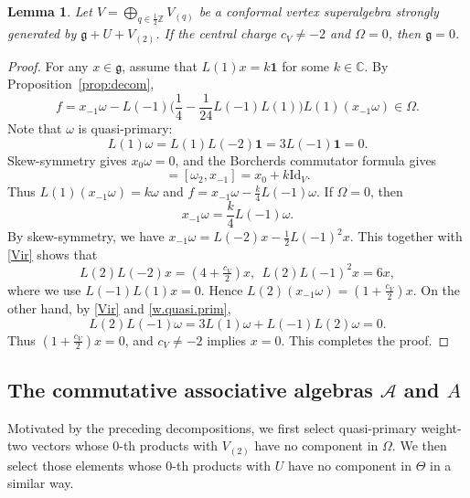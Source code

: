 \documentclass[12pt]{article}
\numberwithin{equation}{section}
\newtheorem{lemma}[theorem]{Lemma}
\theoremstyle{definition}
\theoremstyle{plain}
\newcommand{\bC}{\ensuremath{\mathbb{C}}}
\newcommand{\bZ}{\ensuremath{\mathbb{Z}}}
\newcommand{\fg}{\mathfrak{g}}
\newcommand{\Id}{\mathrm{Id }}
\newcommand{\cA}{\ensuremath{\mathcal{A}}}
\newcommand{\bone}{\mathbf{1 }}
\begin{document}
\begin{lemma}\label{lem:c=-2}
    Let $V=\bigoplus_{q\in\frac{1}{2}\bZ}V_{(q)}$ be a conformal vertex superalgebra strongly generated by $\fg+U+V_{(2)}$. If the central charge $c_V\neq-2$ and $\Omega=0$, then $\fg=0$.
\end{lemma}
\begin{proof}
    For any $x\in\fg$, assume that $L(1)x=k\bone$ for some $k\in\bC$. By Proposition~\ref{prop:decom},
    \begin{equation*}
        f=x_{-1}\omega-L(-1)\Big(\frac14-\frac1{24}L(-1)L(1)\Big)L(1)(x_{-1}\omega)
        \in\Omega.
    \end{equation*}
    Note that $\omega$ is quasi-primary:
    \begin{equation}\label{w.quasi.prim}
        L(1)\omega=L(1)L(-2)\bone=3L(-1)\bone=0.
    \end{equation}
    Skew-symmetry gives $x_0\omega=0$, and the Borcherds commutator formula gives
    \begin{equation*}
        [L(1),x_{-1}]=[\omega_2,x_{-1}]=x_0+k\Id_V.
    \end{equation*}
    Thus $L(1)(x_{-1}\omega)=k\omega$ and $f=x_{-1}\omega-\frac{k}{4}L(-1)\omega$. If $\Omega=0$, then
    \begin{equation*}
        x_{-1}\omega=\frac{k}{4}L(-1)\omega.
    \end{equation*}
    By skew-symmetry, we have $x_{-1}\omega=L(-2)x-\frac12L(-1)^2x$. This together with \eqref{Vir} shows that
    \begin{equation*}
        L(2)L(-2)x=(4+\tfrac{c_V}{2})x,\ \ L(2)L(-1)^2x=6x,
    \end{equation*}
    where we use $L(-1)L(1)x=0$. Hence $L(2)(x_{-1}\omega)=(1+\frac{c_V}{2})x$. On the other hand, by \eqref{Vir} and \eqref{w.quasi.prim},
    \begin{equation*}
        L(2)L(-1)\omega=3L(1)\omega+L(-1)L(2)\omega=0.
    \end{equation*}
    Thus $(1+\frac{c_V}{2})x=0$, and $c_V\ne-2$ implies $x=0$. This completes the proof.
\end{proof}


\subsection{The commutative associative algebras $\cA$ and $A$}
\hspace{1.5em}Motivated by the preceding decompositions, we first select quasi-primary weight-two vectors whose 0-th products with $V_{(2)}$ have no component in $\Omega$. We then select those elements whose 0-th products with $U$ have no component in $\Theta$ in a similar way.
\end{document}
